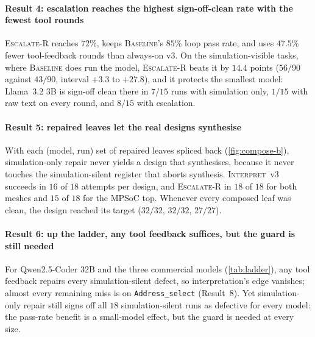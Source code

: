 \documentclass[11pt]{article}
\newcommand{\cname}[1]{\textsc{#1}}
\newcommand{\Base}{\cname{Baseline}}
\newcommand{\Interp}{\cname{Interpret}}
\newcommand{\EscR}{\cname{Escalate-R}}
\newcommand{\Ithree}{\Interp~v3}
\begin{document}
\paragraph{Result 4: escalation reaches the highest sign-off-clean rate with the
fewest tool rounds} \EscR{} reaches $72\%$, keeps \Base's $85\%$ loop pass rate,
and uses $47.5\%$ fewer tool-feedback rounds than always-on v3. On the
simulation-visible tasks, where \Base{} does run the model, \EscR{} beats it by
$14.4$ points ($56/90$ against $43/90$, interval $+3.3$ to $+27.8$), and it
protects the smallest model: Llama~3.2 3B is sign-off clean there in $7/15$ runs
with simulation only, $1/15$ with raw text on every round, and $8/15$ with
escalation.

\paragraph{Result 5: repaired leaves let the real designs synthesise} With each
(model, run) set of repaired leaves spliced back (\cref{fig:compose-b}),
simulation-only repair never yields a design that synthesises, because it never
touches the simulation-silent register that aborts synthesis. \Ithree{}
succeeds in $16$ of $18$ attempts per design, and \EscR{} in $18$ of $18$ for
both meshes and $15$ of $18$ for the MPSoC top. Whenever every composed leaf was
clean, the design reached its target ($32/32$, $32/32$, $27/27$).

\paragraph{Result 6: up the ladder, any tool feedback suffices, but the guard is
still needed} For Qwen2.5-Coder 32B and the three commercial models
(\cref{tab:ladder}), any tool feedback repairs every simulation-silent defect,
so interpretation's edge vanishes; almost every remaining miss is on
\texttt{Address\_select} (Result~8). Yet simulation-only repair still signs off
all $18$ simulation-silent runs as defective for every model: the pass-rate
benefit is a small-model effect, but the guard is needed at every size.
\end{document}
